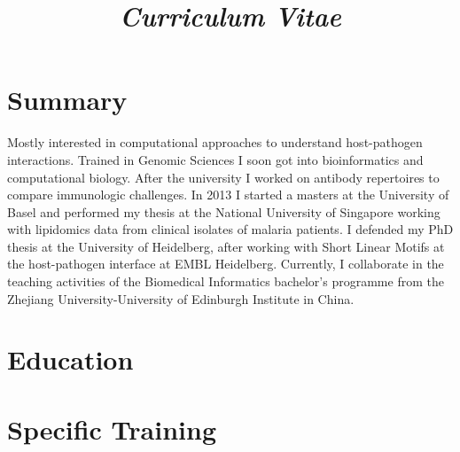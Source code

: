 \documentclass[11pt,a4paper,sans]{moderncv} %
\title{\emph{Curriculum Vitae}}
\begin{document}
\makecvtitle %
\vspace{-1.2cm}
\section{Summary}
Mostly interested in computational approaches to understand host-pathogen interactions. Trained in Genomic Sciences I soon got into bioinformatics and computational biology. After the university I worked on antibody repertoires to compare immunologic challenges. In 2013 I started a masters at the University of Basel and performed my thesis at the National University of Singapore working with lipidomics data from clinical isolates of malaria patients. I defended my PhD thesis at the University of Heidelberg, after working with Short Linear Motifs at the host-pathogen interface at EMBL Heidelberg. Currently, I collaborate in the teaching activities of the Biomedical Informatics bachelor's programme from the Zhejiang University-University of Edinburgh Institute in China.

\section{Education}


\section{Specific Training}


\end{document}
